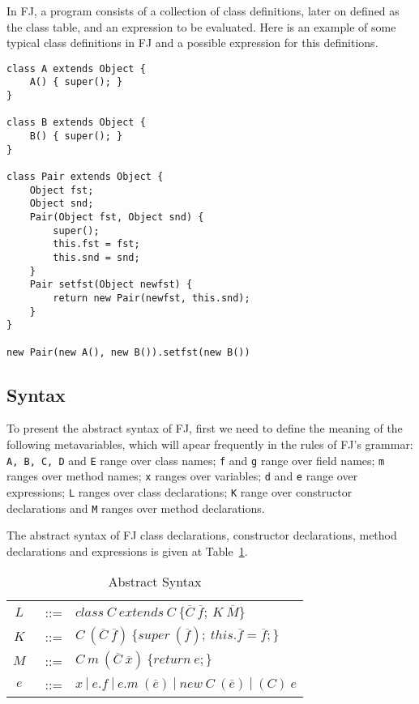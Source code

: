In FJ, a program consists of a collection of class definitions, later on defined
as the class table, and an expression to be evaluated. Here is an example of some typical
class definitions in FJ and a possible expression for this definitions.

\begin{verbatim} 
class A extends Object {
    A() { super(); } 
} 

class B extends Object { 
    B() { super(); }
} 

class Pair extends Object { 
    Object fst; 
    Object snd;
    Pair(Object fst, Object snd) { 
        super(); 
        this.fst = fst; 
        this.snd = snd; 
    } 
    Pair setfst(Object newfst) { 
        return new Pair(newfst, this.snd); 
    } 
} 

new Pair(new A(), new B()).setfst(new B())
\end{verbatim}

\subsection{Syntax}

To present the abstract syntax of FJ, first we need to define the meaning of the
following metavariables, which will apear frequently in the rules of FJ's
grammar: \texttt{A, B, C, D} and \texttt{E} range over class names; \texttt{f}
and \texttt{g} range over field names; \texttt{m} ranges over method names;
\texttt{x} ranges over variables; \texttt{d} and \texttt{e} range over
expressions; \texttt{L} ranges over class declarations; \texttt{K} range over
constructor declarations and \texttt{M} ranges over method declarations.

The abstract syntax of FJ class declarations, constructor declarations, method
declarations and expressions is given at Table~\ref{abstractsyntax}.

\begin{table}[h!]
\begin{tabular}{ccl}
    $L$&~::= & $class\ C~extends~C\ \{\overline{C} \ \overline{f};\ K\
\overline{M}\}$\\ 
    \vspace{0.8mm}
    $K$&~::= &
$C~(\overline{C}~\overline{f})\
\{super~(\overline{f});~this.\overline{f}=\overline{f};\}$\\
    \vspace{0.8mm}
$M$&~::= & $C~m~(\overline{C}~\overline{x})\ \{return~e;\}$\\
    \vspace{0.8mm}
$e$&~::= & $x~|~e.f~|~e.m~(\overline{e})~|~new~C~(\overline{e})~|~(C)~e$ \\
\end{tabular} \\
\vspace{1.5mm}
\caption{Abstract Syntax}
\label{abstractsyntax}
\end{table}


